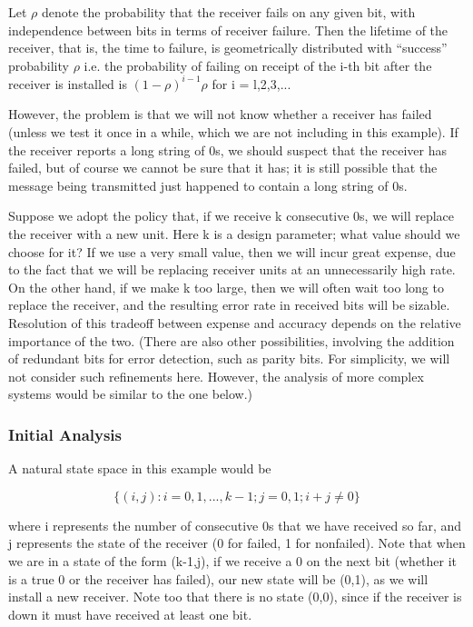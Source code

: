 Let $\rho$ denote the probability that the receiver fails on any given
bit, with independence between bits in terms of receiver failure.  Then
the lifetime of the receiver, that is, the time to failure, is
geometrically distributed with ``success'' probability $\rho $ i.e. the
probability of failing on receipt of the i-th bit after the receiver is
installed is $(1-\rho)^{i-1}\rho$ for i = l,2,3,... 

However, the problem is that we will not know whether a receiver has
failed (unless we test it once in a while, which we are not including in
this example).  If the receiver reports a long string of 0s, we should
suspect that the receiver has failed, but of course we cannot be sure
that it has; it is still possible that the message being transmitted
just happened to contain a long string of 0s.

Suppose we adopt the policy that, if we receive k consecutive 0s, we
will replace the receiver with a new unit. Here k is a design parameter;
what value should we choose for it? If we use a very small value, then
we will incur great expense, due to the fact that we will be replacing
receiver units at an unnecessarily high rate. On the other hand, if we
make k too large, then we will often wait too long to replace the
receiver, and the resulting error rate in received bits will be sizable.
Resolution of this tradeoff between expense and accuracy depends on the
relative importance of the two. (There are also other possibilities,
involving the addition of redundant bits for error detection, such as
parity bits. For simplicity, we will not consider such refinements here.
However, the analysis of more complex systems would be similar to the
one below.)

\subsubsection{Initial Analysis}

A natural state space in this example would be

\begin{equation}
\{(i,j):i=0,1,...,k-1;j=0,1;i+j\neq 0\}
\end{equation}

where i represents the number of consecutive 0s that we have received so
far, and j represents the state of the receiver (0 for failed, 1 for
nonfailed).  Note that when we are in a state of the form (k-1,j), if we
receive a 0 on the next bit (whether it is a true 0 or the receiver has
failed), our new state will be (0,1), as we will install a new receiver.
Note too that there is no state (0,0), since if the receiver is down it
must have received at least one bit.

